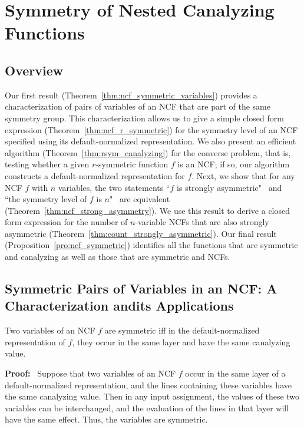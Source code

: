 \section{Symmetry of Nested Canalyzing Functions}
\label{sec:ncf_and_symmetry}

\subsection{Overview}
\label{sse:res_overview}
Our first result (Theorem~\ref{thm:ncf_symmetric_variables})
provides a characterization of pairs of variables of an NCF
that are part of the same symmetry group. 
This characterization allows us to give a simple closed form
expression (Theorem~\ref{thm:ncf_r_symmetric}) 
for the symmetry level of an NCF specified using
its default-normalized representation.
We also present an efficient algorithm (Theorem~\ref{thm:rsym_canalyzing})
for the converse problem, that is,
testing whether a given $r$-symmetric function $f$ is an NCF;
if so, our algorithm constructs a default-normalized 
representation for $f$.
Next, we show that for any NCF $f$ with $n$ variables,
the two statements ``$f$ is strongly asymmetric" ~and~
``the symmetry level of $f$ is $n$"~ are equivalent 
(Theorem~\ref{thm:ncf_strong_asymmetry}).
We use this result to derive a closed form expression 
for the number of $n$-variable NCFs that are 
also strongly asymmetric (Theorem~\ref{thm:count_strongly_asymmetric}).
Our final result (Proposition~\ref{pro:ncf_symmetric})
identifies all the functions that are symmetric and
canalyzing as well as those that are symmetric and NCFs.

\subsection{Symmetric Pairs of Variables in an NCF:
A Characterization and\newline its Applications}
\label{sse:ncf_strong_sym}

\begin{theorem}\label{thm:ncf_symmetric_variables}
Two variables of an NCF $f$ are symmetric iff
in the default-normalized representation of $f$,
they occur in the same layer and have the same canalyzing value.
\end{theorem}
\noindent
\textbf{Proof:}~
Suppose that two variables of an NCF $f$ occur in the same layer of a
default-normalized representation, and the lines containing these variables
have the same canalyzing value.  Then in any input assignment, the
values of these two variables can be interchanged, and the evaluation
of the lines in that layer will have the same effect.  Thus, the
variables are symmetric.

